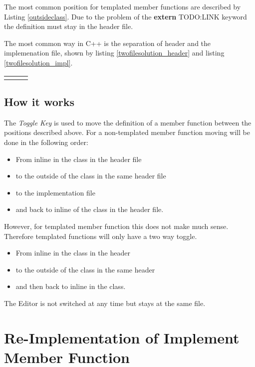 \documentclass[a4paper,12pt,abstract=on]{scrreprt}
\begin{document}
The most common position for templated member functions are described by
Listing \ref{outsideclass}. Due to the problem of the \textbf{extern} TODO:LINK
keyword the definition must stay in the header file.


The most common way in C++ is the separation of header and the implemenation
file, shown by listing \ref{twofilesolution_header} and listing
\ref{twofilesolution_impl}.

\begin{tabular}{p{5cm}p{.5cm}p{6cm}}

& & 

\end{tabular}

\subsection{How it works}

The \textit{Toggle Key} is used to move the definition of a member function
between the positions described above. For a non-templated member function
moving will be done in the following order:
\begin{itemize}
 \item From inline in the class in the header file
 \item to the outside of the class in the same header file
 \item to the implementation file
 \item and back to inline of the class in the header file.
\end{itemize}

However, for templated member function this does not make much sense. Therefore
templated functions will only have a two way toggle.
\begin{itemize}
 \item From inline in the class in the header
 \item to the outside of the class in the same header
 \item and then back to inline in the class.
\end{itemize}

The Editor is not switched at any time but stays at the same file.

\section{Re-Implementation of Implement Member Function}
\end{document}
